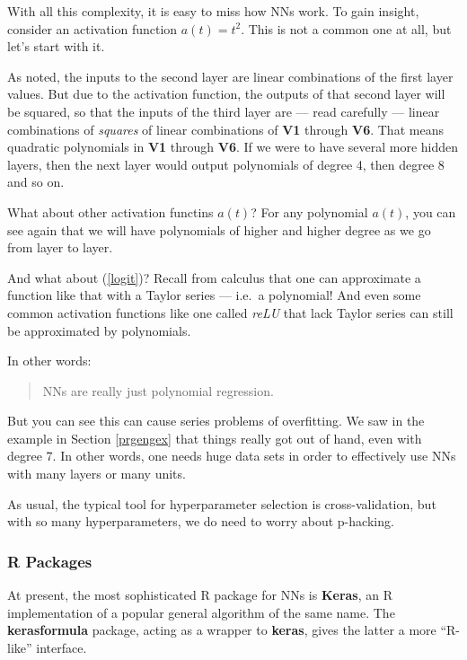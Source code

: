 With all this complexity, it is easy to miss how NNs work.  To gain
insight, consider an activation function $a(t) = t^2$.  This is not a
common one at all, but let's start with it.

As noted, the inputs to the second layer are linear combinations of the
first layer values.  But due to the activation function, the outputs of
that second layer will be squared, so that the inputs of the third layer
are --- read carefully --- linear combinations of \textit{squares} of
linear combinations of \textbf{V1} through \textbf{V6}.  That means
quadratic polynomials in \textbf{V1} through \textbf{V6}.  If we were to
have several more hidden layers, then the next layer would output
polynomials of degree 4, then degree 8 and so on.

What about other activation functins $a(t)$?  For any polynomial $a(t)$,
you can see again that we will have polynomials of higher and higher
degree as we go from layer to layer.

And what about (\ref{logit})?  Recall from calculus that one can
approximate a function like that with a Taylor series --- i.e.\ a
polynomial!  And even some common activation functions like one called
\textit{reLU} that lack Taylor series can still be approximated by
polynomials.

In other words:

\begin{quote}
NNs are really just polynomial regression.
\end{quote}

But you can see this can cause series problems of overfitting.  We saw
in the example in Section \ref{prgengex} that things really got out of
hand, even with degree 7.  In other words, one needs huge data sets in
order to effectively use NNs with many layers or many units.

As usual, the typical tool for hyperparameter selection is
cross-validation, but with so many hyperparameters, we do need to worry
about p-hacking.

\subsubsection{R Packages}

At present, the most sophisticated R package for NNs is \textbf{Keras},
an R implementation of a popular general algorithm of the same name.  The
\textbf{kerasformula} package, acting as a wrapper to \textbf{keras},
gives the latter a more ``R-like'' interface.

